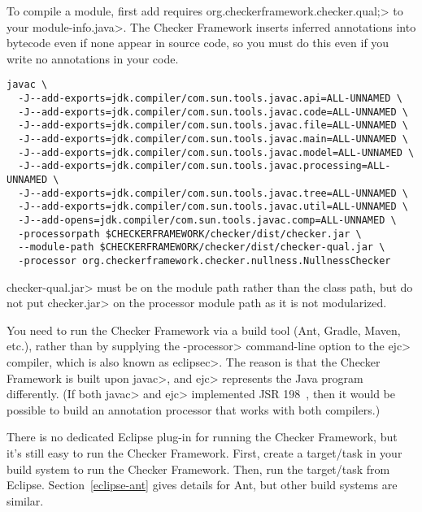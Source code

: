 
To compile a module, first add \<requires
org.checkerframework.checker.qual;> to your \<module-info.java>.  The Checker
Framework inserts inferred annotations into bytecode even if none appear in source code,
so you must do this even if you write no annotations in your code.

\begin{Verbatim}
javac \
  -J--add-exports=jdk.compiler/com.sun.tools.javac.api=ALL-UNNAMED \
  -J--add-exports=jdk.compiler/com.sun.tools.javac.code=ALL-UNNAMED \
  -J--add-exports=jdk.compiler/com.sun.tools.javac.file=ALL-UNNAMED \
  -J--add-exports=jdk.compiler/com.sun.tools.javac.main=ALL-UNNAMED \
  -J--add-exports=jdk.compiler/com.sun.tools.javac.model=ALL-UNNAMED \
  -J--add-exports=jdk.compiler/com.sun.tools.javac.processing=ALL-UNNAMED \
  -J--add-exports=jdk.compiler/com.sun.tools.javac.tree=ALL-UNNAMED \
  -J--add-exports=jdk.compiler/com.sun.tools.javac.util=ALL-UNNAMED \
  -J--add-opens=jdk.compiler/com.sun.tools.javac.comp=ALL-UNNAMED \
  -processorpath $CHECKERFRAMEWORK/checker/dist/checker.jar \
  --module-path $CHECKERFRAMEWORK/checker/dist/checker-qual.jar \
  -processor org.checkerframework.checker.nullness.NullnessChecker
\end{Verbatim}

\<checker-qual.jar> must be on the module path rather than the class path, but
do not put \<checker.jar> on the processor module path as it is not
modularized.


\sectionAndLabel{Eclipse}{eclipse}


You
need to run the Checker Framework via a build tool (Ant, Gradle, Maven, etc.), rather
than by supplying the \<-processor> command-line option to the \<ejc>
compiler, which is also known as \<eclipsec>.
The reason is that the Checker Framework is built upon \<javac>,
and \<ejc> represents the Java program differently.  (If both \<javac> and \<ejc>
implemented JSR 198~\cite{JSR198}, then it would be possible to build
an annotation processor that works with both compilers.)


There is no dedicated Eclipse plug-in for running the Checker Framework,
but it's still easy to run the Checker Framework.  First, create a
target/task in your build system to run the Checker Framework.  Then, run
the target/task from Eclipse.  Section~\ref{eclipse-ant} gives details for
Ant, but other build systems are similar.


